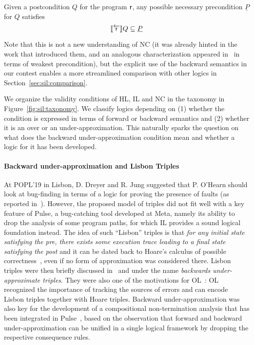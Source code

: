 \begin{prop}\label{prop:sil:nc}
	Given a postcondition $Q$ for the program $\mathsf{r}$, any possible necessary precondition $\underline{P}$ for $Q$ satisfies
	\[
	\llbracket\overleftarrow{\mathsf{r}}\rrbracket Q \subseteq \underline{P}
	\]
\end{prop}

Note that this is not a new understanding of NC (it was already hinted in the work that introduced them, and an analogous characterization appeared in~\cite[§6.3]{ZK22} in terms of weakest precondition), but the explicit use of the backward semantics in our contest enables a more streamlined comparison with other logics in Section~\ref{sec:sil:comparison}.

We organize the validity conditions of HL, IL and NC in the taxonomy in Figure~\ref{fig:sil:taxonomy}. We classify logics depending on (1) whether the condition is expressed in terms of forward or backward semantics and (2) whether it is an over or an under-approximation.
This naturally sparks the question on what does the backward under-approximation condition mean and whether a logic for it has been developed.

\paragraph{Backward under-approximation and Lisbon Triples}
At POPL'19 in Lisbon, D. Dreyer and R. Jung suggested that P. O'Hearn should look at bug-finding in terms of a logic for proving the presence of faults (as reported in~\cite{OHearn20,ZDS23}).
However, the proposed model of triples did not fit well with a key feature of Pulse, a bug-catching tool developed at Meta, namely its ability to drop the analysis of some program paths, for which IL provides a sound logical foundation instead.
The idea of such ``Lisbon'' triples is that \emph{for any initial state satisfying the pre, there exists some execution trace leading to a final state satisfying the post} and it can be dated back to Hoare's calculus of possible correctness~\cite{Hoare78}, even if no form of approximation was considered there.
Lisbon triples were then briefly discussed in~\cite[\S 5]{MOH21} and \cite[\S 3.2]{LRVBDO22} under the name \emph{backwards under-approximate triples}. They were also one of the motivations for OL~\cite{ZDS23}: OL recognized the importance of tracking the sources of errors and can encode Lisbon triples together with Hoare triples.
Backward under-approximation was also key for the development of a compositional non-termination analysis that has been integrated in Pulse~\cite{RVO24}, based on the observation that forward and backward under-approximation can be unified in a single logical framework by dropping the respective consequence rules.

